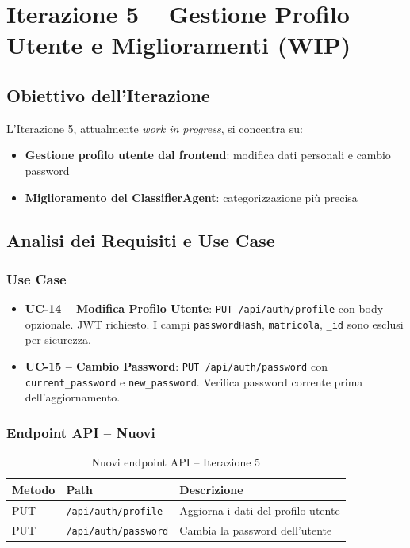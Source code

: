 \documentclass[a4paper,12pt]{report}
\begin{document}
\chapter{Iterazione 5 -- Gestione Profilo Utente e Miglioramenti (WIP)}

\section{Obiettivo dell'Iterazione}

L'Iterazione 5, attualmente \textit{work in progress}, si concentra su:
\begin{itemize}
    \item \textbf{Gestione profilo utente dal frontend}: modifica dati personali e cambio password
    \item \textbf{Miglioramento del ClassifierAgent}: categorizzazione più precisa
\end{itemize}

\section{Analisi dei Requisiti e Use Case}

\subsection{Use Case}

\begin{itemize}
    \item \textbf{UC-14 -- Modifica Profilo Utente}: \texttt{PUT /api/auth/profile} con body opzionale. JWT richiesto. I campi \texttt{passwordHash}, \texttt{matricola}, \texttt{\_id} sono esclusi per sicurezza.

    \item \textbf{UC-15 -- Cambio Password}: \texttt{PUT /api/auth/password} con \texttt{current\_password} e \texttt{new\_password}. Verifica password corrente prima dell'aggiornamento.
\end{itemize}

\subsection{Endpoint API -- Nuovi}

\begin{table}[H]
\centering
\begin{tabularx}{\textwidth}{l l X}
\toprule
\textbf{Metodo} & \textbf{Path} & \textbf{Descrizione} \\
\midrule
PUT & \texttt{/api/auth/profile} & Aggiorna i dati del profilo utente \\
PUT & \texttt{/api/auth/password} & Cambia la password dell'utente \\
\bottomrule
\end{tabularx}
\caption{Nuovi endpoint API -- Iterazione 5}
\end{table}
\end{document}
